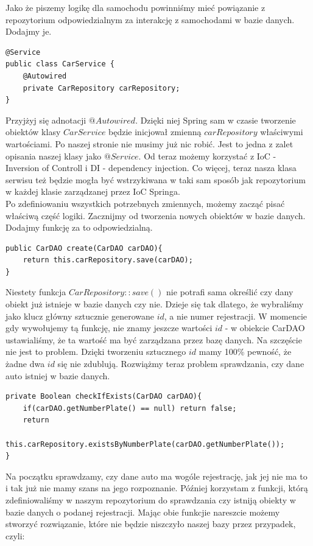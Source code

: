 \documentclass{article}
\begin{document}
        Jako że piszemy logikę dla samochodu powinniśmy mieć powiązanie z repozytorium odpowiedzialnym za interakcję z samochodami w bazie danych. Dodajmy je.
        \begin{verbatim}
@Service
public class CarService {
    @Autowired
    private CarRepository carRepository;  
}

        \end{verbatim}
        Przyjżyj się adnotacji $@Autowired$. Dzięki niej Spring sam w czasie tworzenie obiektów klasy $CarService$ będzie inicjował zmienną $carRepository$ właściwymi wartościami. Po naszej stronie nie musimy już nic robić. Jest to jedna z zalet opisania naszej klasy jako $@Service$. Od teraz możemy korzystać z IoC - Inversion of Controll i DI - dependency injection. Co więcej, teraz nasza klasa serwisu też będzie mogła być wstrzykiwana w taki sam sposób jak repozytorium w każdej klasie zarządzanej przez IoC Springa. \\
        Po zdefiniowaniu wszystkich potrzebnych zmiennych, możemy zacząć pisać właściwą część logiki. Zacznijmy od tworzenia nowych obiektów w bazie danych. Dodajmy funkcję za to odpowiedzialną.
        \begin{verbatim}
public CarDAO create(CarDAO carDAO){
    return this.carRepository.save(carDAO);
}
        \end{verbatim}
        Niestety funkcja $CarRepository::save()$ nie potrafi sama określić czy dany obiekt już istnieje w bazie danych czy nie. Dzieje się tak dlatego, że wybraliśmy jako klucz główny sztucznie generowane $id$, a nie numer rejestracji. W momencie gdy wywołujemy tą funkcję, nie znamy jeszcze wartości $id$ - w obiekcie CarDAO ustawialiśmy, że ta wartość ma być zarządzana przez bazę danych. Na szczęście nie jest to problem. Dzięki tworzeniu sztucznego $id$ mamy 100\% pewność, że żadne dwa $id$ się nie zdublują. Rozwiążmy teraz problem sprawdzania, czy dane auto istniej w bazie danych.
        \begin{verbatim}
private Boolean checkIfExists(CarDAO carDAO){
    if(carDAO.getNumberPlate() == null) return false;
    return
            this.carRepository.existsByNumberPlate(carDAO.getNumberPlate());
}
        \end{verbatim}
        Na początku sprawdzamy, czy dane auto ma wogóle rejestrację, jak jej nie ma to i tak już nie mamy szans na jego rozpoznanie. Później korzystam z funkcji, którą zdefiniowaliśmy w naszym repozytorium do sprawdzania czy istniją obiekty w bazie danych o podanej rejestracji. Mając obie funkcjie nareszcie możemy stworzyć rozwiązanie, które nie będzie niszczyło naszej bazy przez przypadek, czyli:
\end{document}
